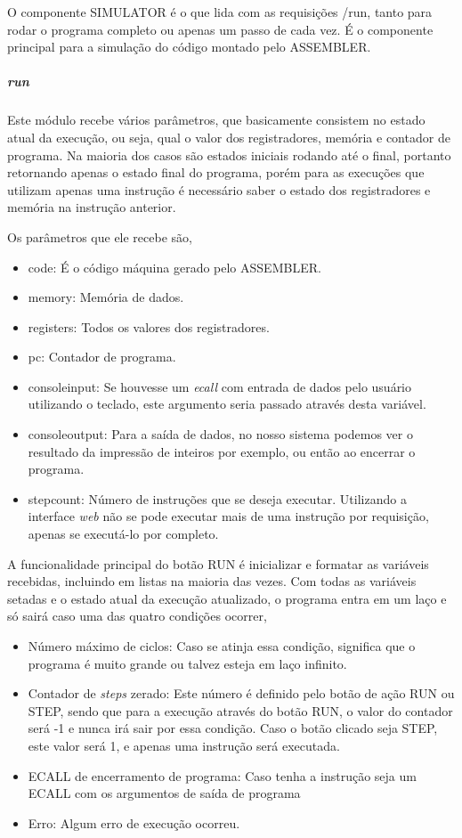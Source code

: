 			O componente SIMULATOR é o que lida com as requisições /run, tanto para rodar o programa completo ou apenas um passo de cada vez. É o componente principal para a simulação do código montado pelo ASSEMBLER.

				\subparagraph{run}

					Este módulo recebe vários parâmetros, que basicamente consistem no estado atual da execução, ou seja, qual o valor dos registradores, memória e contador de programa. Na maioria dos casos são estados iniciais rodando até o final, portanto retornando apenas o estado final do programa, porém para as execuções que utilizam apenas uma instrução é necessário saber o estado dos registradores e memória na instrução anterior.

					Os parâmetros que ele recebe são, 
					\begin{itemize} 
						\item code: É o código máquina gerado pelo ASSEMBLER.
						\item memory: Memória de dados.
						\item registers: Todos os valores dos registradores.
						\item pc: Contador de programa.
						\item console\textunderscore input: Se houvesse um \textit{ecall} com entrada de dados pelo usuário utilizando o teclado, este argumento seria passado através desta variável. 
						\item console\textunderscore  output: Para a saída de dados, no nosso sistema podemos ver o resultado da impressão de inteiros por exemplo, ou então ao encerrar o programa.
						\item step\textunderscore count: Número de instruções que se deseja executar. Utilizando a interface \textit{web} não se pode executar mais de uma instrução por requisição, apenas se executá-lo por completo.
					\end{itemize}

					A funcionalidade principal do botão RUN é inicializar e formatar as variáveis recebidas, incluindo em listas na maioria das vezes. Com todas as variáveis setadas e o estado atual da execução atualizado, o programa entra em um laço e só sairá caso uma das quatro condições ocorrer,

					\begin{itemize} 
						\item Número máximo de ciclos: Caso se atinja essa condição, significa que o programa é muito grande ou talvez esteja em laço infinito.
						\item Contador de \textit{steps} zerado: Este número é definido pelo botão de ação RUN ou STEP, sendo que para a execução através do botão RUN, o valor do contador será -1 e nunca irá sair por essa condição. Caso o botão clicado seja STEP, este valor será 1, e apenas uma instrução será executada.
						\item ECALL de encerramento de programa: Caso tenha a instrução seja um ECALL com os argumentos de saída de programa
						\item Erro: Algum erro de execução ocorreu.
						
					\end{itemize}

